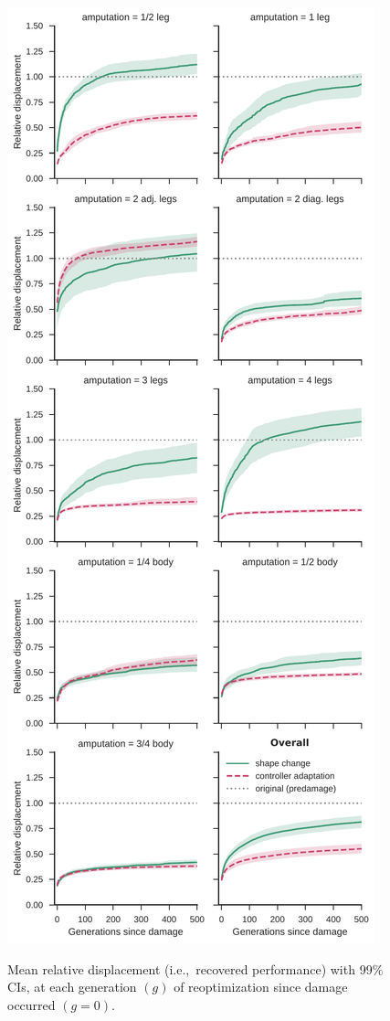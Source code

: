 

\begin{figure}
\begin{center}
\vspace{-2em}
\includegraphics[width=0.5\linewidth]{Chapter05/fig/RSS_Recovery.pdf}\\
\caption{\label{fig5:recovery}
Mean relative displacement (i.e.,~recovered performance) with 99\% CIs,
at each generation $(g)$ of reoptimization since damage occurred $(g=0)$.
}
\end{center}
\end{figure}

